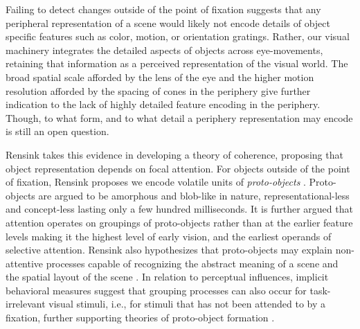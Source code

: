 \documentclass[a4paper,10pt,final]{ThesisStyle}
\begin{document}
Failing to detect changes outside of the point of fixation suggests that any peripheral representation of a scene would likely not encode details of object specific features such as color, motion, or orientation gratings.  Rather, our visual machinery integrates the detailed aspects of objects across eye-movements, retaining that information as a perceived representation of the visual world.  The broad spatial scale afforded by the lens of the eye and the higher motion resolution afforded by the spacing of cones in the periphery give further indication to the lack of highly detailed feature encoding in the periphery.  Though, to what form, and to what detail a periphery representation may encode is still an open question.  

Rensink takes this evidence in developing a theory of coherence, proposing that object representation depends on focal attention.  For objects outside of the point of fixation, Rensink proposes we encode volatile units of \textit{proto-objects} \cite{Rensink2000,Rensink2001}.  Proto-objects are argued to be amorphous and blob-like in nature, representational-less and concept-less lasting only a few hundred milliseconds.  It is further argued that attention operates on groupings of proto-objects rather than at the earlier feature levels making it the highest level of early vision, and the earliest operands of selective attention.  Rensink also hypothesizes that proto-objects may explain non-attentive processes capable of recognizing the abstract meaning of a scene and the spatial layout of the scene \cite{Rensink2002}.  In relation to perceptual influences, implicit behavioral measures suggest that grouping processes can also occur for task-irrelevant visual stimuli, i.e., for stimuli that has not been attended to by a fixation, further supporting theories of proto-object formation \cite{Lamy2006}.

\end{document}
